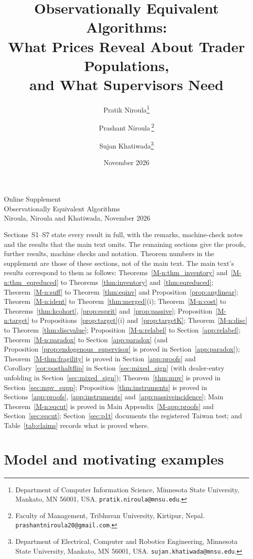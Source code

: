 \documentclass[12pt]{article}
\title{Observationally Equivalent Algorithms:\\ What Prices Reveal About Trader Populations,\\ and What Supervisors Need}
\author{Pratik Niroula\thanks{Department of Computer Information Science, Minnesota State University, Mankato, MN 56001, USA. \texttt{pratik.niroula@mnsu.edu}.}
\and Prashant Niroula\,\thanks{Faculty of Management, Tribhuvan University, Kirtipur, Nepal. \texttt{prashantniroula20@gmail.com}.}
\and Sujan Khatiwada\thanks{Department of Electrical, Computer and Robotics Engineering, Minnesota State University, Mankato, MN 56001, USA. \texttt{sujan.khatiwada@mnsu.edu}.}}
\date{November 2026}
\theoremstyle{definition}
\theoremstyle{remark}
\begin{document}
\singlespacing\small\sloppy
\renewcommand{\topfraction}{0.9}\renewcommand{\bottomfraction}{0.8}\renewcommand{\textfraction}{0.07}\renewcommand{\floatpagefraction}{0.75}
\setcounter{page}{1}\setcounter{table}{0}\setcounter{figure}{0}
\begin{center}{\Large Online Supplement}\\[4pt]{\large Observationally Equivalent Algorithms}\\[2pt]{\normalsize Niroula, Niroula and Khatiwada, November 2026}\end{center}

\noindent Sections~S1--S7 state every result in full, with the remarks, machine-check notes and the results that the main text omits. The remaining sections give the proofs, further results, machine checks and notation. Theorem numbers in the supplement are those of these sections, not of the main text. The main text's results correspond to them as follows: Theorems~\ref{M-n:thm_inventory} and~\ref{M-n:thm_eqreduced} to Theorems~\ref{thm:inventory} and~\ref{thm:eqreduced}; Theorem~\ref{M-n:suff} to Theorem~\ref{thm:eqinv} and Proposition~\ref{prop:anylinear}; Theorem~\ref{M-n:ident} to Theorem~\ref{thm:merged}(i); Theorem~\ref{M-n:cost} to Theorems~\ref{thm:kcohort}, \ref{prop:esprit} and~\ref{prop:passive}; Proposition~\ref{M-n:target} to Propositions~\ref{prop:target}(i) and~\ref{prop:targetK}; Theorem~\ref{M-n:disc} to Theorem~\ref{thm:discvalue}; Proposition~\ref{M-n:relabel} to Section~\ref{app:relabel}; Theorem~\ref{M-n:paradox} to Section~\ref{app:paradox} (and Proposition~\ref{prop:endogenous_supervisor} is proved in Section~\ref{app:paradox}); Theorem~\ref{M-thm:fragility} is proved in Section~\ref{app:proofs} and Corollary~\ref{cor:posthaltflip} in Section~\ref{sec:mixed_sign} (with dealer-entry unfolding in Section~\ref{sec:mixed_sign}); Theorem~\ref{thm:mpv} is proved in Section~\ref{sec:mpv_supp}; Proposition~\ref{thm:instruments} is proved in Sections~\ref{app:proofs}, \ref{app:instruments} and~\ref{app:passiveincidence}; Main Theorem~\ref{M-n:eqcut} is proved in Main Appendix~\ref{M-app:proofs} and Section~\ref{sec:eqcut}; Section~\ref{sec:p1t} documents the registered Taiwan test; and Table~\ref{tab:claims} records what is proved where. 

\section{Model and motivating examples}\label{sec:model}
\end{document}
